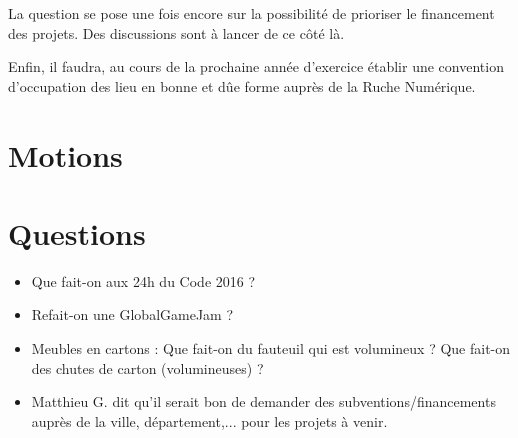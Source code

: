 \documentclass[11pt]{article}
\begin{document}
La question se pose une fois encore sur la possibilité de prioriser le financement des projets. Des discussions sont à
lancer de ce côté là.

Enfin, il faudra, au cours de la prochaine année d'exercice établir une convention d'occupation des lieu en bonne et dûe
forme auprès de la Ruche Numérique.

\section{Motions}

\section{Questions}

\begin{itemize}
	\item Que fait-on aux 24h du Code 2016 ?
	\item Refait-on une GlobalGameJam ?
	\item Meubles en cartons : Que fait-on du fauteuil qui est volumineux ? Que fait-on des chutes de carton (volumineuses) ?
	\item Matthieu G. dit qu'il serait bon de demander des subventions/financements auprès de la ville, département,... pour les projets à venir.
\end{itemize}
\end{document}
